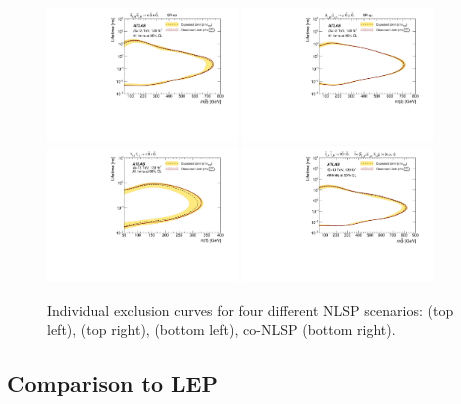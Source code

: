 \begin{figure}[!ht]
    \centering
        \includegraphics[width=0.45\textwidth]{figures/limits/SRee_Slep.pdf}
        \includegraphics[width=0.45\textwidth]{figures/limits/SRmm_Slep.pdf}
        \includegraphics[width=0.45\textwidth]{figures/limits/Stau.pdf}
        \includegraphics[width=0.45\textwidth]{figures/limits/Comb.pdf}
    \caption{Individual exclusion curves for four different \ac{NLSP} scenarios: \selec (top left), \smu (top right), \stau (bottom left), co-\ac{NLSP} (bottom right).}
    \label{fig:plot_cls}
\end{figure}

\subsection{Comparison to LEP}

